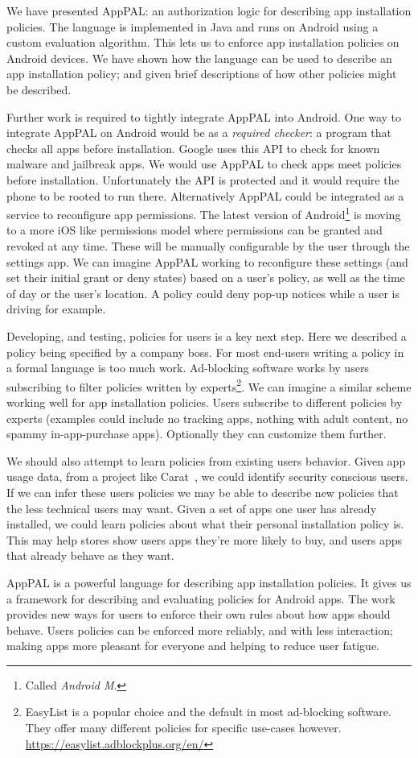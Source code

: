 \documentclass[]{llncs}
\begin{document}
We have presented AppPAL: an authorization logic for describing app installation policies.
The language is implemented in Java and runs on Android using a custom evaluation algorithm.
This lets us to enforce app installation policies on Android devices.
We have shown how the language can be used to describe an app installation policy;
  and given brief descriptions of how other policies might be described.

Further work is required to tightly integrate AppPAL into Android.
One way to integrate AppPAL on Android would be as a \emph{required checker}: a program that checks all apps before installation.
Google uses this API to check for known malware and jailbreak apps.
We would use AppPAL to check apps meet policies before installation.
Unfortunately the API is protected and it would require the phone to be rooted to run there.
Alternatively AppPAL could be integrated as a service to reconfigure app permissions.
The latest version of Android\footnote{Called \emph{Android M}.} is moving to a more iOS like permissions model where permissions can be granted and revoked at any time.
These will be manually configurable by the user through the settings app.
We can imagine AppPAL working to reconfigure these settings (and set their initial grant or deny states) based on a user's policy, as well as the time of day or the user's location.
A policy could deny pop-up notices while a user is driving for example.

Developing, and testing, policies for users is a key next step.
Here we described a policy being specified by a company boss.
For most end-users writing a policy in a formal language is too much work.
Ad-blocking software works by users subscribing to filter policies written by experts\footnote{EasyList is a popular choice and the default in most ad-blocking software. They offer many different policies for specific use-cases however. \url{https://easylist.adblockplus.org/en/}}.
We can imagine a similar scheme working well for app installation policies.
Users subscribe to different policies by experts (examples could include no tracking apps, nothing with adult content, no spammy in-app-purchase apps).
Optionally they can customize them further.

We should also attempt to learn policies from existing users behavior.
Given app usage data, from a project like Carat~\cite{Oliner:2013ht}, we could identify security conscious users.
If we can infer these users policies we may be able to describe new policies that the less technical users may want.
Given a set of apps one user has already installed, we could learn policies about what their personal installation policy is.
This may help stores show users apps they're more likely to buy, and users apps that already behave as they want.

AppPAL is a powerful language for describing app installation policies.
It gives us a framework for describing and evaluating policies for Android apps.
The work provides new ways for users to enforce their own rules about how apps should behave.
Users policies can be enforced more reliably, and with less interaction;
making apps more pleasant for everyone and helping to reduce user fatigue.



\end{document}

